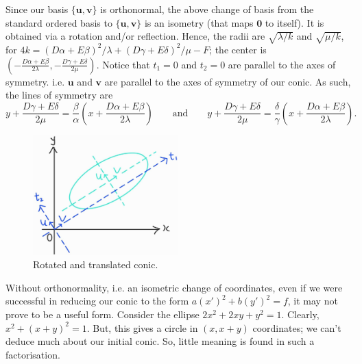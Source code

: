\documentclass[../Notes.tex]{subfiles}
\begin{document}
Since our basis \(\{\mathbf{u},\mathbf{v}\}\) is orthonormal, the above change of basis from the standard ordered basis to \(\{\mathbf{u},\mathbf{v}\}\) is an isometry (that maps \(\mathbf{0}\) to itself). It is obtained via a rotation and/or reflection. Hence, the radii are \(\sqrt{\lambda/k}\) and \(\sqrt{\mu/k}\), for \(4k=(D\alpha+E\beta)^2/\lambda+(D\gamma+E\delta)^2/\mu-F\); the center is \(\left(-\frac{D\alpha+E\beta}{2\lambda},-\frac{D\gamma+E\delta}{2\mu} \right)\). Notice that \(t_1=0\) and \(t_2=0\) are parallel to the axes of symmetry. i.e. \(\mathbf{u}\) and \(\mathbf{v}\) are parallel to the axes of symmetry of our conic. As such, the lines of symmetry are 
\[y+\frac{D\gamma+E\delta}{2\mu}=\frac{\beta}{\alpha}\left( x+\frac{D\alpha+E\beta}{2\lambda} \right) \qquad\text{and}\qquad y+\frac{D\gamma+E\delta}{2\mu}=\frac{\delta}{\gamma}\left( x+\frac{D\alpha+E\beta}{2\lambda} \right).\]
\begin{figure}[htbp]
    \centering
    \includegraphics[width=0.5\textwidth]{../Diagrams/rotated-conics.jpg}
    \caption{Rotated and translated conic.}
    \label{fig:rotated-conic}
\end{figure}
\begin{note}
    Without orthonormality, i.e. an isometric change of coordinates, even if we were successful in reducing our conic to the form \(a(x')^2+b(y')^2=f\), it may not prove to be a useful form. Consider the ellipse \(2x^2+2xy+y^2=1\). Clearly, \(x^2+(x+y)^2=1\). But, this gives a circle in \((x,x+y)\) coordinates; we can't deduce much about our initial conic. So, little meaning is found in such a factorisation. 
\end{note}
    
\end{document}
